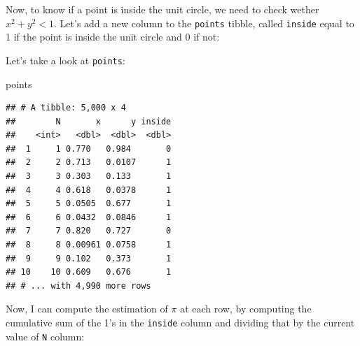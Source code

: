 \documentclass[]{gitbook}
\newenvironment{Shaded}{\begin{snugshade}}{\end{snugshade}}
\newcommand{\DataTypeTok}[1]{\textcolor[rgb]{0.13,0.29,0.53}{#1}}
\newcommand{\DecValTok}[1]{\textcolor[rgb]{0.00,0.00,0.81}{#1}}
\newcommand{\KeywordTok}[1]{\textcolor[rgb]{0.13,0.29,0.53}{\textbf{#1}}}
\newcommand{\NormalTok}[1]{#1}
\newcommand{\OperatorTok}[1]{\textcolor[rgb]{0.81,0.36,0.00}{\textbf{#1}}}
\newcommand{\StringTok}[1]{\textcolor[rgb]{0.31,0.60,0.02}{#1}}
\begin{document}
Now, to know if a point is inside the unit circle, we need to check wether \(x^2 + y^2 < 1\). Let's
add a new column to the \texttt{points} tibble, called \texttt{inside} equal to 1 if the point is inside the
unit circle and 0 if not:

\begin{Shaded}
\end{Shaded}

Let's take a look at \texttt{points}:

\begin{Shaded}
\begin{Highlighting}[]
\NormalTok{points}
\end{Highlighting}
\end{Shaded}

\begin{verbatim}
## # A tibble: 5,000 x 4
##        N       x      y inside
##    <int>   <dbl>  <dbl>  <dbl>
##  1     1 0.770   0.984       0
##  2     2 0.713   0.0107      1
##  3     3 0.303   0.133       1
##  4     4 0.618   0.0378      1
##  5     5 0.0505  0.677       1
##  6     6 0.0432  0.0846      1
##  7     7 0.820   0.727       0
##  8     8 0.00961 0.0758      1
##  9     9 0.102   0.373       1
## 10    10 0.609   0.676       1
## # ... with 4,990 more rows
\end{verbatim}

Now, I can compute the estimation
of \(\pi\) at each row, by computing the cumulative sum of the 1's in the \texttt{inside} column and dividing
that by the current value of \texttt{N} column:

\begin{Shaded}
\end{Shaded}
\end{document}
